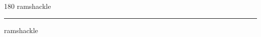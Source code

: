 
\begin{frame}
\begin{center}
\begin{turn}{180}
{\fontsize{2.5cm}{1em}\selectfont ramshackle}
\end{turn}
\vspace{1em}\par  
\hrule
\vspace{1em}\par  
{\fontsize{2.5cm}{1em}\selectfont ramshackle}
\end{center}
\end{frame}
